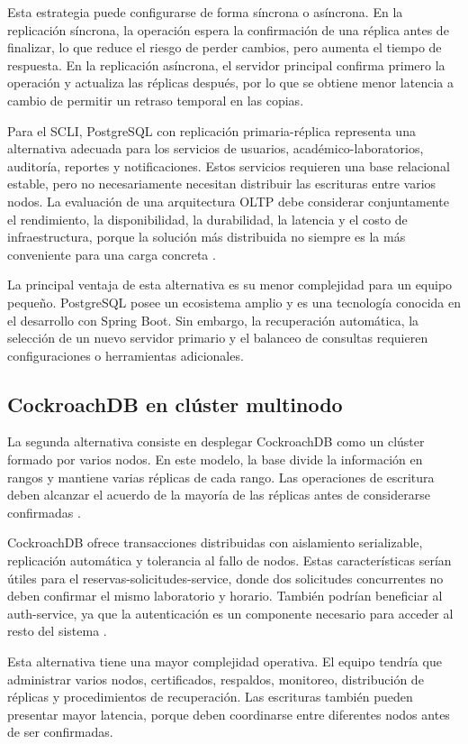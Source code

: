 \documentclass[conference]{IEEEtran}
\begin{document}
Esta estrategia puede configurarse de forma síncrona o asíncrona. En la replicación síncrona, la operación espera la confirmación de una réplica antes de finalizar, lo que reduce el riesgo de perder cambios, pero aumenta el tiempo de respuesta. En la replicación asíncrona, el servidor principal confirma primero la operación y actualiza las réplicas después, por lo que se obtiene menor latencia a cambio de permitir un retraso temporal en las copias.

Para el SCLI, PostgreSQL con replicación primaria-réplica representa una alternativa adecuada para los servicios de usuarios, académico-laboratorios, auditoría, reportes y notificaciones. Estos servicios requieren una base relacional estable, pero no necesariamente necesitan distribuir las escrituras entre varios nodos. La evaluación de una arquitectura OLTP debe considerar conjuntamente el rendimiento, la disponibilidad, la durabilidad, la latencia y el costo de infraestructura, porque la solución más distribuida no siempre es la más conveniente para una carga concreta \cite{ref12}.

La principal ventaja de esta alternativa es su menor complejidad para un equipo pequeño. PostgreSQL posee un ecosistema amplio y es una tecnología conocida en el desarrollo con Spring Boot. Sin embargo, la recuperación automática, la selección de un nuevo servidor primario y el balanceo de consultas requieren configuraciones o herramientas adicionales.

\subsection{CockroachDB en clúster multinodo}
La segunda alternativa consiste en desplegar CockroachDB como un clúster formado por varios nodos. En este modelo, la base divide la información en rangos y mantiene varias réplicas de cada rango. Las operaciones de escritura deben alcanzar el acuerdo de la mayoría de las réplicas antes de considerarse confirmadas \cite{ref13}.

CockroachDB ofrece transacciones distribuidas con aislamiento serializable, replicación automática y tolerancia al fallo de nodos. Estas características serían útiles para el reservas-solicitudes-service, donde dos solicitudes concurrentes no deben confirmar el mismo laboratorio y horario. También podrían beneficiar al auth-service, ya que la autenticación es un componente necesario para acceder al resto del sistema \cite{ref13}.

Esta alternativa tiene una mayor complejidad operativa. El equipo tendría que administrar varios nodos, certificados, respaldos, monitoreo, distribución de réplicas y procedimientos de recuperación. Las escrituras también pueden presentar mayor latencia, porque deben coordinarse entre diferentes nodos antes de ser confirmadas.
\end{document}
